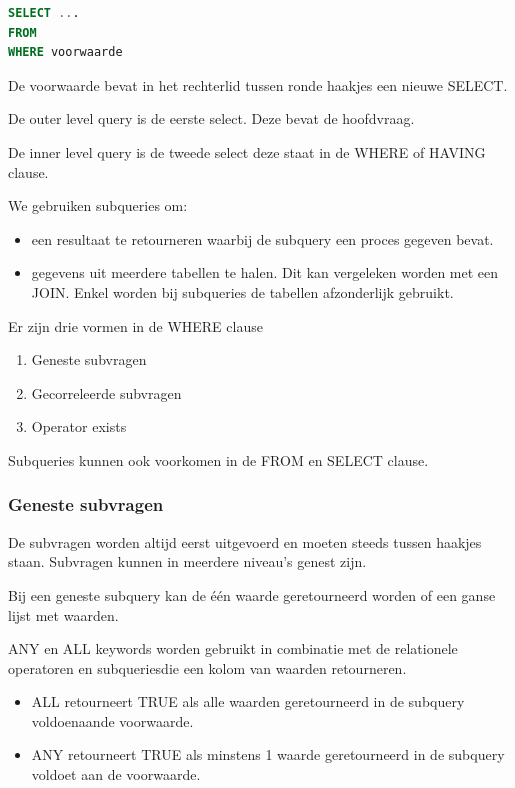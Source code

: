 \documentclass[a4paper,12pt]{article}
\begin{document}
\begin{lstlisting}[language=sql]
SELECT ...
FROM
WHERE voorwaarde
\end{lstlisting}

De voorwaarde bevat in het rechterlid tussen ronde haakjes een nieuwe SELECT.

De outer level query is de eerste select. Deze bevat de hoofdvraag.

De inner level query is de tweede select deze staat in de WHERE of HAVING clause.

We gebruiken subqueries om:
\begin{itemize}
\item een resultaat te retourneren waarbij de subquery een proces gegeven bevat.
\item gegevens uit meerdere tabellen te halen. Dit kan vergeleken worden met een JOIN.
Enkel worden bij subqueries de tabellen afzonderlijk gebruikt.
\end{itemize}

Er zijn drie vormen in de WHERE clause
\begin{enumerate}
\item Geneste subvragen
\item Gecorreleerde subvragen
\item Operator exists
\end{enumerate}

Subqueries kunnen ook voorkomen in de FROM en SELECT clause.

\subsubsection{Geneste subvragen}
De subvragen worden altijd eerst uitgevoerd en moeten steeds tussen haakjes staan. Subvragen kunnen in meerdere niveau's genest zijn.

Bij een geneste subquery kan de één waarde geretourneerd worden of een ganse lijst met waarden.

ANY en ALL keywords worden gebruikt in combinatie met de relationele operatoren en subqueriesdie een kolom van waarden retourneren.

\begin{itemize}
\item ALL retourneert TRUE als alle waarden geretourneerd in de subquery voldoenaande voorwaarde.
\item ANY retourneert TRUE als minstens 1 waarde geretourneerd in de subquery voldoet aan de voorwaarde.
\end{itemize}
\end{document}
